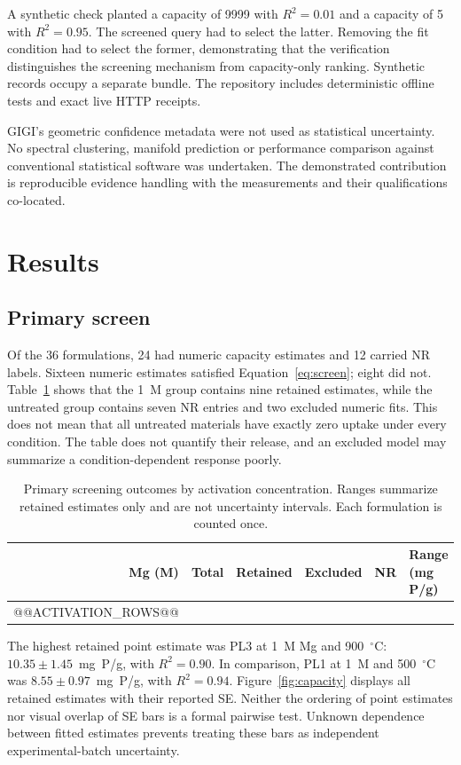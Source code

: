 \documentclass[11pt,letterpaper]{article}
\begin{document}
A synthetic check planted a capacity of 9999 with $R^2=0.01$ and a capacity of 5 with $R^2=0.95$. The screened query had to select the latter. Removing the fit condition had to select the former, demonstrating that the verification distinguishes the screening mechanism from capacity-only ranking. Synthetic records occupy a separate bundle. The repository includes deterministic offline tests and exact live HTTP receipts.

GIGI's geometric confidence metadata were not used as statistical uncertainty. No spectral clustering, manifold prediction or performance comparison against conventional statistical software was undertaken. The demonstrated contribution is reproducible evidence handling with the measurements and their qualifications co-located.

\section{Results}
\subsection{Primary screen}
Of the 36 formulations, 24 had numeric capacity estimates and 12 carried NR labels. Sixteen numeric estimates satisfied Equation~\ref{eq:screen}; eight did not. Table~\ref{tab:activation} shows that the 1~M group contains nine retained estimates, while the untreated group contains seven NR entries and two excluded numeric fits. This does not mean that all untreated materials have exactly zero uptake under every condition. The table does not quantify their release, and an excluded model may summarize a condition-dependent response poorly.

\begin{table}[htbp]
\centering\small
\caption{Primary screening outcomes by activation concentration. Ranges summarize retained estimates only and are not uncertainty intervals. Each formulation is counted once.}
\label{tab:activation}
\begin{tabular}{@{}rrrrrl@{}}
\toprule
Mg (M) & Total & Retained & Excluded & NR & Range (mg P/g)\\
\midrule
@@ACTIVATION_ROWS@@
\bottomrule
\end{tabular}
\end{table}

The highest retained point estimate was PL3 at 1~M Mg and 900~$^\circ$C: $10.35\pm1.45$~mg~P/g, with $R^2=0.90$. In comparison, PL1 at 1~M and 500~$^\circ$C was $8.55\pm0.97$~mg~P/g, with $R^2=0.94$. Figure~\ref{fig:capacity} displays all retained estimates with their reported SE. Neither the ordering of point estimates nor visual overlap of SE bars is a formal pairwise test. Unknown dependence between fitted estimates prevents treating these bars as independent experimental-batch uncertainty.
\end{document}

